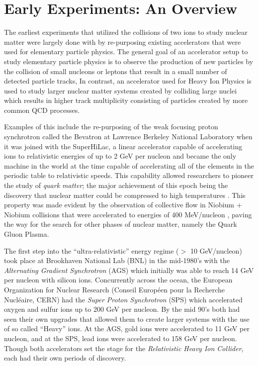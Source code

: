 \section{Early Experiments: An Overview} \label{sect:earlyexperiments}
The earliest experiments that utilized the collisions of two ions to study nuclear matter were largely done with by re-purposing existing accelerators that were used for elementary particle physics. The general goal of an accelerator setup to study elementary particle physics is to observe the production of new particles by the collision of small nucleons or leptons that result in a small number of detected particle tracks, In contrast, an accelerator used for Heavy Ion Physics is used to study larger nuclear matter systems created by colliding large nuclei which results in higher track multiplicity consisting of particles created by more common QCD processes. 

Examples of this include the re-purposing of the weak focusing proton synchrotron called the Bevatron at Lawrence Berkeley National Laboratory when it was joined with the SuperHiLac, a linear accelerator capable of accelerating ions to relativistic energies of up to 2 GeV per nucleon and became the only machine in the world at the time capable of accelerating all of the elements in the periodic table to relativistic speeds. This capability allowed researchers to pioneer the study of \textit{quark matter}\citep{bevalac9lives}; the major achievement of this epoch being the discovery that nuclear matter could be compressed to high temperatures \citep{ROBINSON857}. This property was made evident by the observation of collective flow in Niobium + Niobium collisions that were accelerated to energies of 400 MeV/nucleon \citep{PhysRevLett.52.1590}, paving the way for the search for other phases of nuclear matter, namely the Quark Gluon Plasma.

The first step into the ``ultra-relativistic'' energy regime ($>$ 10 GeV/nucleon) took place at Brookhaven National Lab (BNL) in the mid-1980's with the \textit{Alternating Gradient Synchrotron} (AGS) which initially was able to reach 14 GeV per nucleon with silicon ions. Concurrently across the ocean, the European Organization for Nuclear Research (Conseil Europ\'{e}en pour la Recherche Nucl\'{e}aire, CERN) had the \textit{Super Proton Synchrotron} (SPS) which accelerated oxygen and sulfur ions up to 200 GeV per nucleon. By the mid 90's both had seen their own upgrades that allowed them to create larger systems with the use of so called ``Heavy'' ions. At the AGS, gold ions were accelerated to 11 GeV per nucleon, and at the SPS, lead ions were accelerated to 158 GeV per nucleon\citep{wojciechphenomenology}. Though both accelerators set the stage for the \textit{Relativistic Heavy Ion Collider}, each had their own periods of discovery. 

